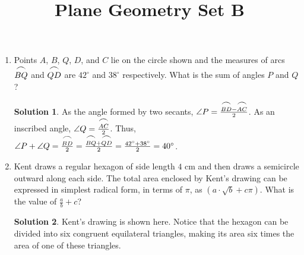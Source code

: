 \documentclass{article}
\title{Plane Geometry Set B}
\date{}
\author{}
\theoremstyle{definition}
\newtheorem*{solution}{Solution}
\begin{document}
\maketitle

\begin{multicols}{2}
    \begin{enumerate}
        \item Points $A$, $B$, $Q$, $D$, and $C$ lie on the circle shown and the measures of arcs $\stackrel{\mbox{\large$\frown$}}{BQ}$ and $\stackrel{\mbox{\large$\frown$}}{QD}$ are $42^{\circ}$ and $38^{\circ}$ respectively.
            What is the sum of angles $P$ and $Q$?
            \begin{center}
            \end{center}
            \begin{solution}
                As the angle formed by two secants, $\angle P = \frac{\stackrel{\mbox{\large$\frown$}}{BD} - \stackrel{\mbox{\large$\frown$}}{AC}}{2}$.
                As an inscribed angle, $\angle Q = \frac{\stackrel{\mbox{\large$\frown$}}{AC}}{2}$.
                Thus, $\angle P + \angle Q = \frac{\stackrel{\mbox{\large$\frown$}}{BD}}{2} = \frac{\stackrel{\mbox{\large$\frown$}}{BQ} + \stackrel{\mbox{\large$\frown$}}{QD}}{2} = \frac{42^{\circ} + 38^{\circ}}{2} = 40^{\circ}$.
            \end{solution}
        \item Kent draws a regular hexagon of side length $4$ cm and then draws a semicircle outward along each side.
            The total area enclosed by Kent's drawing can be expressed in simplest radical form, in terms of $\pi$, as $(a \cdot \sqrt{b} + c\pi)$.
            What is the value of $\frac{a}{b} + c$?
            \begin{solution}
                Kent's drawing is shown here.
                Notice that the hexagon can be divided into six congruent equilateral triangles, making its area six times the area of one of these triangles.

\end{solution}
\end{enumerate}
\end{multicols}
\end{document}
